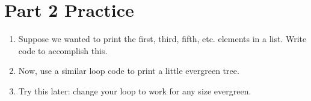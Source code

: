 \documentclass[letterpaper,10pt,english]{sphinxmanual}
\begin{document}
\section{Part 2 Practice}
\label{\detokenize{lecture_notes/lec09_loops1_while:part-2-practice}}\begin{enumerate}
\item {} 
Suppose we wanted to print the first, third, fifth, etc. elements
in a list. Write code to accomplish this.

%
\begin{sphinxVerbatim}[commandchars=\\\{\}]
\PYG{p}{[}\PYG{p}{]}
\end{sphinxVerbatim}

\item {} 
Now, use a similar loop code to print a little evergreen tree.

%
\begin{sphinxVerbatim}[commandchars=\\\{\}]
\end{sphinxVerbatim}

\item {} 
Try this later: change your loop to work for any size evergreen.

\end{enumerate}
\end{document}

